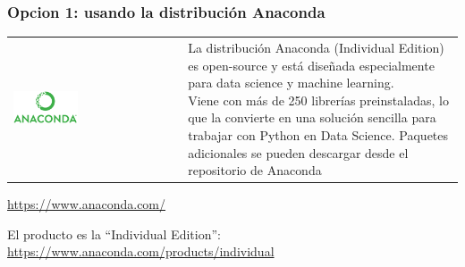 \documentclass[9pt]{beamer}
\begin{document}
          \begin{frame}
            \frametitle{Opcion 1: usando la distribución Anaconda}
            \begin{tabularx}{\linewidth}{XX}
              \includegraphics[width=0.4\textwidth]{anaconda_logo_big}
              &
              \parbox{0.5\textwidth}{    La distribución Anaconda
                (Individual Edition) es open-source y está diseñada
                especialmente para  data science y  machine learning. \\
                Viene con más de 250 librerías preinstaladas, lo que
                la convierte en una solución sencilla para trabajar
                con Python en Data Science. Paquetes
                adicionales se pueden descargar desde el repositorio
                de Anaconda}

            \end{tabularx}\bigskip
            \begin{center}
              {\huge \href{https://www.anaconda.com/}{https://www.anaconda.com/}}
            \end{center}\medskip

            El producto es la ``Individual Edition'':\\ \smallskip
            {\huge \href{https://www.anaconda.com/products/individual}{https://www.anaconda.com/products/individual}}
          \end{frame}
        
\end{document}
